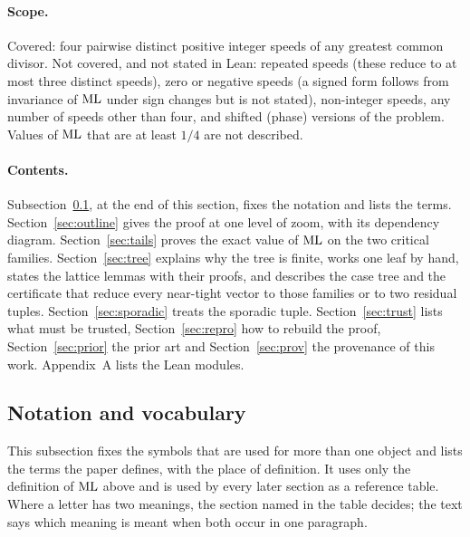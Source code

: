 \documentclass[11pt]{article}
\theoremstyle{remark}
\begin{document}
\paragraph{Scope.} Covered: four pairwise distinct positive integer speeds of any greatest common divisor. Not covered, and not stated in Lean: repeated speeds (these reduce to at most three distinct speeds), zero or negative speeds (a signed form follows from invariance of $\mathrm{ML}$ under sign changes but is not stated), non-integer speeds, any number of speeds other than four, and shifted (phase) versions of the problem. Values of $\mathrm{ML}$ that are at least $1/4$ are not described.

\paragraph{Contents.} Subsection~\ref{sec:notation}, at the end of this section, fixes the notation and lists the terms. Section~\ref{sec:outline} gives the proof at one level of zoom, with its dependency diagram. Section~\ref{sec:tails} proves the exact value of $\mathrm{ML}$ on the two critical families. Section~\ref{sec:tree} explains why the tree is finite, works one leaf by hand, states the lattice lemmas with their proofs, and describes the case tree and the certificate that reduce every near-tight vector to those families or to two residual tuples. Section~\ref{sec:sporadic} treats the sporadic tuple. Section~\ref{sec:trust} lists what must be trusted, Section~\ref{sec:repro} how to rebuild the proof, Section~\ref{sec:prior} the prior art and Section~\ref{sec:prov} the provenance of this work. Appendix~A lists the Lean modules.

\subsection{Notation and vocabulary}\label{sec:notation}

This subsection fixes the symbols that are used for more than one object and lists the terms the paper defines, with the place of definition. It uses only the definition of $\mathrm{ML}$ above and is used by every later section as a reference table. Where a letter has two meanings, the section named in the table decides; the text says which meaning is meant when both occur in one paragraph.
\end{document}
